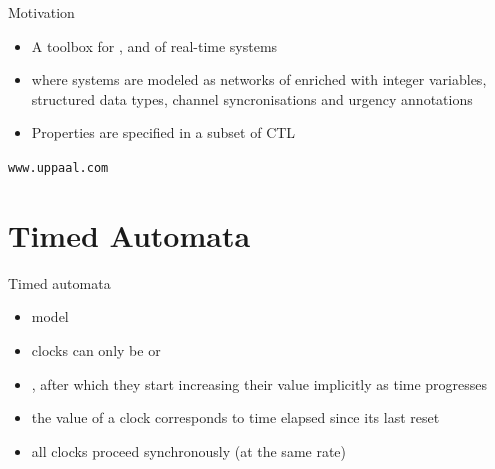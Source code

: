 \documentclass[aspectratio=169]{beamer}
\begin{document}
\begin{slide}{Motivation}
\small



\begin{center}
\end{center}

\begin{itemize}
\item  A toolbox for ,  and  of real-time systems
\item where systems are modeled as networks of  enriched with \alert{integer variables},
\alert{structured data types},
\alert{channel syncronisations} and
\alert{urgency annotations}
\item  Properties are specified in a subset of CTL 
\end{itemize}


\begin{flushright}
\texttt{www.uppaal.com}
\end{flushright}
\end{slide}


\section{Timed Automata} %

\begin{slide}{Timed automata}
\small


\begin{itemize}
\item {} model
\item clocks can only be  or
\item {}, after which they start increasing their value implicitly as time progresses
\item the value of a clock corresponds to time elapsed since its last reset 
\item all clocks proceed synchronously (at the same rate)
\end{itemize}

\end{slide}
\end{document}
